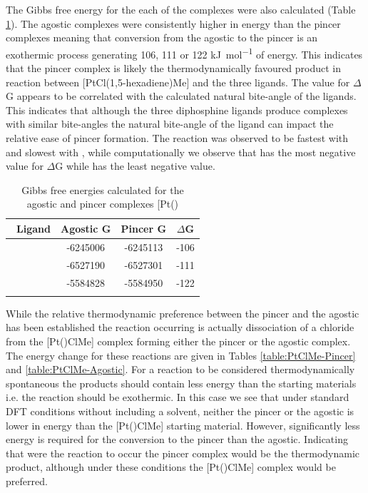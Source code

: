 The Gibbs free energy for the each of the complexes were also calculated (Table \ref{table:PtMeenergies}).  The agostic complexes were consistently higher in energy than the pincer complexes meaning that conversion from the agostic to the pincer is an exothermic process generating 106, 111 or 122 \si{\kilo\joule\per\mole} of energy.  This indicates that the pincer complex is likely the thermodynamically favoured product in reaction between [PtCl(1,5-hexadiene)Me] and the three \tBuxantphos{} ligands.  The value for $\Delta$G appears to be correlated with the calculated natural bite-angle of the ligands.  This indicates that although the three diphosphine ligands produce complexes with similar bite-angles the natural bite-angle of the ligand can impact the relative ease of pincer formation.  The reaction was observed to be fastest with \tBuxantphos{} and slowest with \tBusixantphos{}, while computationally we observe that \tBuxantphos{} has the most negative value for $\Delta$G while \tBusixantphos{} has the least negative value.  


\begin{table}[htp]
\caption[Gibbs free energies calculated for agostic and pincer [Pt(\tBuxantphos)\ce{Me{]}+}]{Gibbs free energies calculated for the agostic and pincer complexes [Pt(\tBuxantphosk)\ce{Me]+}}
\vspace{1em}
\label{table:PtMeenergies}
\small
\begin{center}
\begin{tabular}{l c c c}
	\toprule
	~\bfseries{Ligand} & Agostic G & Pincer G & $\Delta$G \\
	\midrule		
	~\tBuSixantphos	& -6245006	& -6245113 	& -106 \\
	~\tBuThixantphos	& -6527190	& -6527301	& -111 \\
	~\tBuXantphos{}	& -5584828	& -5584950	& -122 \\ 
	\bottomrule{}
\end{tabular}
\end{center}
\end{table}

While the relative thermodynamic preference between the pincer and the agostic has been established the reaction occurring is actually dissociation of a chloride from the [Pt(\tBuxantphos)ClMe] complex forming either the pincer or the agostic complex.  The energy change for these reactions are given in Tables \ref{table:PtClMe-Pincer} and \ref{table:PtClMe-Agostic}.  For a reaction to be considered thermodynamically spontaneous the products should contain less energy than the starting materials i.e. the reaction should be exothermic.  In this case we see that under standard DFT conditions without including a solvent, neither the pincer or the agostic is lower in energy than the [Pt(\tBuxantphos)ClMe] starting material.  However, significantly less energy is required for the conversion to the pincer than the agostic.  Indicating that were the reaction to occur the pincer complex would be the thermodynamic product, although under these conditions the [Pt(\tBuxantphos)ClMe] complex would be preferred.  

